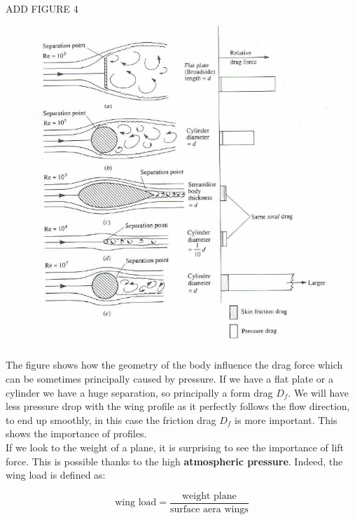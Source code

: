 		\begin{center}
		ADD FIGURE 4
		\end{center}
		
		\begin{figure}
		\vspace{-5mm}
		\includegraphics[scale=0.4]{ch2/2}
		\end{figure}
		The figure shows how the geometry of the body influence the drag force which can be sometimes principally caused by pressure. If we have a flat plate or a cylinder we have a huge separation, so principally a form drag $D_f$. We will have less pressure drop with the wing profile as it perfectly follows the flow direction, to end up smoothly, in this case the friction drag $D_f$ is more important. This shows the importance of profiles. \\
		
		If we look to the weight of a plane, it is surprising to see the importance of lift force. This is possible thanks to the high \textbf{atmospheric pressure}. Indeed, the wing load is defined as: 
		
		\begin{equation}
		\mbox{wing load} = \frac{\mbox{weight plane}}{\mbox{surface aera wings}}
		\end{equation}
				
